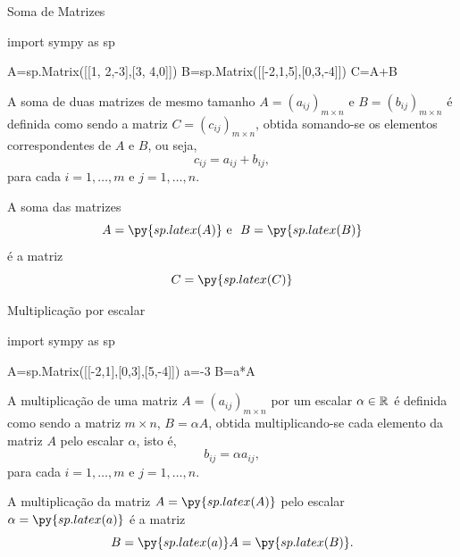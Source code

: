 \begin{frame}[label=matrizes,fragile=singleslide]{Soma de Matrizes}
\begin{pycode}
import sympy as sp

A=sp.Matrix([[1, 2,-3],[3, 4,0]])
B=sp.Matrix([[-2,1,5],[0,3,-4]])
C=A+B
\end{pycode}

A {\color{blue} soma} de duas matrizes de {\color{blue} mesmo tamanho} $A=(a_{ij})_{m\times n}$ e $B=(b_{ij})_{m\times n}$ é definida como sendo a matriz $C=(c_{ij})_{m\times n}$, obtida somando-se os elementos correspondentes de $A$ e $B$, ou seja, 
\[c_{ij}=a_{ij}+b_{ij},\]
para cada $i=1,\ldots,m$ e $j=1,\ldots,n$.

\begin{exe}
A soma das matrizes \[
A=\py{sp.latex(A)} \text{ e } \ 
B=\py{sp.latex(B)}
\]
é a matriz 
\[C=\py{sp.latex(C)}\]
\end{exe}
\end{frame}


\begin{frame}[label=matrizes,fragile=singleslide]{Multiplicação por escalar}
\begin{pycode}
import sympy as sp

A=sp.Matrix([[-2,1],[0,3],[5,-4]])
a=-3
B=a*A
\end{pycode}

A {\color{blue} multiplicação de uma matriz} $A=(a_{ij})_{m\times n}$  {\color{blue} por um escalar} $\alpha\in \mathbb{R}$ é definida como sendo a matriz $m\times n$, $B=\alpha A$, obtida multiplicando-se cada elemento da matriz $A$ pelo escalar $\alpha$, isto é,
\[b_{ij}=\alpha a_{ij},\]
para cada $i=1,\ldots,m$ e $j=1,\ldots,n$.



\end{frame}

\begin{frame}[label=matrizes]

\begin{exe}
A multiplicação  da matriz $A=\py{sp.latex(A)} $ pelo escalar $\alpha=\py{sp.latex(a)}$ é a matriz
\[B=\py{sp.latex(a)} A=\py{sp.latex(B)}.\]
\end{exe}

\end{frame}

